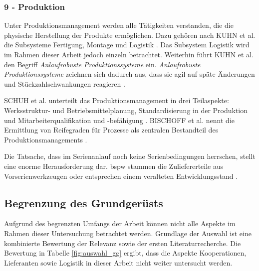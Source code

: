 \subsubsection*{9 - Produktion}
Unter Produktionsmanagement werden alle Tätigkeiten verstanden, die die physische Herstellung der Produkte ermöglichen. Dazu gehören nach KUHN et al. die Subsysteme Fertigung, Montage und Logistik \cite{Kuhn2002}. Das Subsystem Logistik wird im Rahmen dieser Arbeit jedoch einzeln betrachtet. Weiterhin führt KUHN et al. den Begriff \textit{Anlaufrobuste Produktionssysteme} ein. \textit{Anlaufrobuste Produktionssysteme} zeichnen sich dadurch aus, dass sie agil auf späte Änderungen und Stückzahlschwankungen reagieren \cite[20]{Bischoff2007}. 

SCHUH et al. unterteilt das Produktionsmanagement in drei Teilaspekte: Werksstruktur- und Betriebsmittelplanung, Standardisierung in der Produktion und Mitarbeiterqualifikation und {-befähigung} \cite[177]{Schuh2008}. 
BISCHOFF et al. nennt die Ermittlung von Reifegraden für Prozesse als zentralen Bestandteil des Produktionsmanagements \cite[20]{Bischoff2007}. 

Die Tatsache, dass im Serienanlauf noch keine Serienbedingungen herrschen, stellt eine enorme Herausforderung dar. \Gls{bspw} stammen die Zuliefererteile aus Vorserienwerkzeugen oder entsprechen einem veralteten Entwicklungsstand \cite[21]{Kuhn2002}.

\subsection*{Begrenzung des Grundgerüsts}

Aufgrund des begrenzten Umfangs der Arbeit können nicht alle Aspekte im Rahmen dieser Untersuchung betrachtet werden. Grundlage der Auswahl ist eine kombinierte Bewertung der Relevanz sowie der ersten Literaturrecherche. 
Die Bewertung in Tabelle \ref{fig:auswahl_gg}
%  
ergibt, dass die Aspekte Kooperationen, Lieferanten sowie Logistik in dieser Arbeit nicht weiter untersucht werden. 

